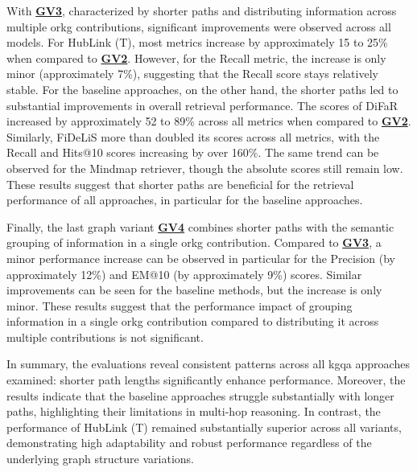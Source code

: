 With \hyperref[enum:gv3]{\textbf{GV3}}, characterized by shorter paths and distributing information across multiple \gls{orkg} contributions, significant improvements were observed across all models. For HubLink (T), most metrics increase by approximately 15 to 25\% when compared to \hyperref[enum:gv2]{\textbf{GV2}}. However, for the Recall metric, the increase is only minor (approximately 7\%), suggesting that the Recall score stays relatively stable. For the baseline approaches, on the other hand, the shorter paths led to substantial improvements in overall retrieval performance. The scores of DiFaR increased by approximately 52 to 89\% across all metrics when compared to \hyperref[enum:gv2]{\textbf{GV2}}. Similarly, FiDeLiS more than doubled its scores across all metrics, with the Recall and Hits@10 scores increasing by over 160\%. The same trend can be observed for the Mindmap retriever, though the absolute scores still remain low. These results suggest that shorter paths are beneficial for the retrieval performance of all approaches, in particular for the baseline approaches.

Finally, the last graph variant \hyperref[enum:gv4]{\textbf{GV4}} combines shorter paths with the semantic grouping of information in a single \gls{orkg} contribution. Compared to \hyperref[enum:gv3]{\textbf{GV3}}, a minor performance increase can be observed in particular for the Precision (by approximately 12\%) and EM@10 (by approximately 9\%) scores. Similar improvements can be seen for the baseline methods, but the increase is only minor. These results suggest that the performance impact of grouping information in a single \gls{orkg} contribution compared to distributing it across multiple contributions is not significant.

In summary, the evaluations reveal consistent patterns across all \gls{kgqa} approaches examined: shorter path lengths significantly enhance performance. Moreover, the results indicate that the baseline approaches struggle substantially with longer paths, highlighting their limitations in multi-hop reasoning. In contrast, the performance of HubLink (T) remained substantially superior across all variants, demonstrating high adaptability and robust performance regardless of the underlying graph structure variations.



